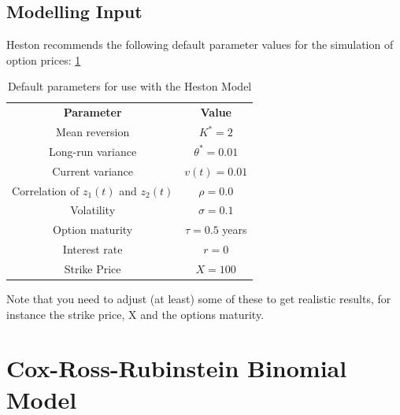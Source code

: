 \documentclass{article}
\begin{document}
\subsection{Modelling Input}
Heston recommends the following default parameter values for the simulation of option prices: \ref{tab:tab1}\newline\newline
\begin{table}[]
    \centering
    \begin{tabular}{c|c}
     \textbf{Parameter} & \textbf{Value} \\
    Mean reversion & $K^{*}=2$ \\
    Long-run variance & $\theta^{*}=0.01$ \\
    Current variance & $v(t) = 0.01$ \\
    Correlation of $z_{1}(t)$ and $z_{2}(t)$ & $\rho = 0.0$ \\
    Volatility & $\sigma = 0.1$ \\
    Option maturity & $\tau = 0.5$ years\\
    Interest rate & $r=0$ \\
    Strike Price & $X=100$ \\
    \end{tabular}
    \caption{Default parameters for use with the Heston Model}
    \label{tab:tab1}
\end{table}
Note that you need to adjust (at least) some of these to get realistic results, for instance the strike price, X and the options maturity.  
\printbibliography

\clearpage
{}
\appendix
\section{Cox-Ross-Rubinstein Binomial Model}
\end{document}
